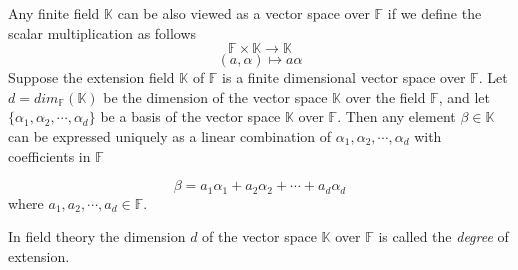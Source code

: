 \documentclass[11pt]{amsart}
\begin{document}
Any finite field $\mathbb K$ can be also viewed as a vector space over $\mathbb{F}$ if we define the scalar multiplication as follows
\[
\mathbb{F}\times \mathbb {K} \rightarrow \mathbb {K}
\]
\[
(a,\alpha)\mapsto a\alpha
\]
Suppose the extension field ${\mathbb K}$ of ${\mathbb F}$ is a finite dimensional vector space over ${\mathbb F}$. Let $d=dim_{\mathbb F}(\mathbb K)$ be the dimension of the vector space ${\mathbb K}$ over the field ${\mathbb F}$, and let $\{\alpha_1, \alpha_2,\cdots,\alpha_d\}$ be a basis of the vector space $\mathbb K$ over $\mathbb F$. Then any element $\beta\in \mathbb K$ can be expressed uniquely as a linear combination of $\alpha_1, \alpha_2,\cdots,\alpha_d$ with coefficients in $\mathbb F$

\[
\beta=a_1\alpha_1+a_2\alpha_2+\cdots+a_d\alpha_d
\]
where $a_1,a_2,\cdots, a_d\in \mathbb F$.

In field theory the dimension $d$ of the vector space $\mathbb K$ over $\mathbb F$ is called the \emph{degree} of extension.
\end{document}
